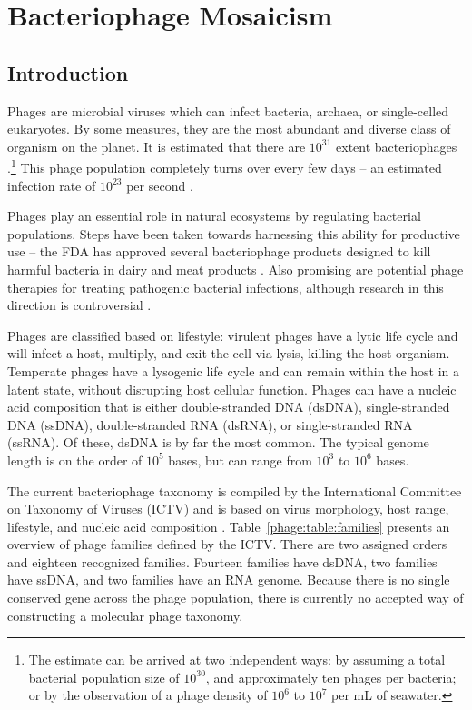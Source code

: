 \chapter{Bacteriophage Mosaicism}
\label{ch:phage}

\section{Introduction}
\label{phage:introduction}


Phages are microbial viruses which can infect bacteria, archaea, or single-celled eukaryotes.
By some measures, they are the most abundant and diverse class of organism on the planet.
It is estimated that there are $10^31$ extent bacteriophages \cite{Rohwer:2014vz}.\footnote{The estimate can be arrived at two independent ways: by assuming a total bacterial population size of $10^30$, and approximately ten phages per bacteria; or by the observation of a phage density of $10^6$ to $10^7$ per mL of seawater.}
This phage population completely turns over every few days -- an estimated infection rate of $10^23$ per second \cite{Suttle:2007cj}.

Phages play an essential role in natural ecosystems by regulating bacterial populations.
Steps have been taken towards harnessing this ability for productive use -- the FDA has approved several bacteriophage products designed to kill harmful bacteria in dairy and meat products \cite{Bren:2007wn}.
Also promising are potential phage therapies for treating pathogenic bacterial infections, although research in this direction is controversial \cite{Keen:2012du}.

Phages are classified based on lifestyle: virulent phages have a lytic life cycle and will infect a host, multiply, and exit the cell via lysis, killing the host organism. Temperate phages have a lysogenic life cycle and can remain within the host in a latent state, without disrupting host cellular function.
Phages can have a nucleic acid composition that is either double-stranded DNA (dsDNA), single-stranded DNA (ssDNA), double-stranded RNA (dsRNA), or single-stranded RNA (ssRNA).
Of these, dsDNA is by far the most common.
The typical genome length is on the order of $10^5$ bases, but can range from $10^3$ to $10^6$ bases.

The current bacteriophage taxonomy is compiled by the International Committee on Taxonomy of Viruses (ICTV) and is based on virus morphology, host range, lifestyle, and nucleic acid composition \cite{ICTV:2012}.
Table~\ref{phage:table:families} presents an overview of phage families defined by the ICTV.
There are two assigned orders and eighteen recognized families.
Fourteen families have dsDNA, two families have ssDNA, and two families have an RNA genome.
Because there is no single conserved gene across the phage population, there is currently no accepted way of constructing a molecular phage taxonomy.

